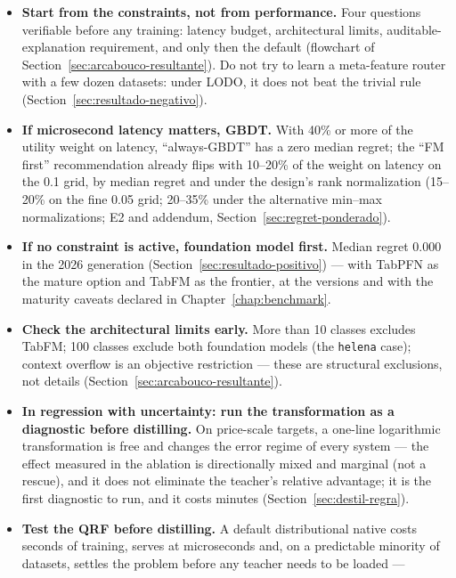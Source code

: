 \begin{itemize}
  \item \textbf{Start from the constraints, not from performance.}
    Four questions verifiable before any training: latency budget,
    architectural limits, auditable-explanation requirement, and only
    then the default (flowchart of
    Section~\ref{sec:arcabouco-resultante}). Do not try to learn a
    meta-feature router with a few dozen datasets: under LODO, it
    does not beat the trivial rule
    (Section~\ref{sec:resultado-negativo}).
  \item \textbf{If microsecond latency matters, GBDT.} With 40\% or
    more of the utility weight on latency, ``always-GBDT'' has a
    zero median regret; the ``FM first'' recommendation already
    flips with 10--20\% of the weight on latency on the 0.1 grid,
    by median regret
    and under the design's rank normalization (15--20\% on the fine
    0.05 grid; 20--35\% under the
    alternative min--max normalizations; E2 and addendum,
    Section~\ref{sec:regret-ponderado}).
  \item \textbf{If no constraint is active, foundation model
    first.} Median regret 0.000 in the 2026 generation
    (Section~\ref{sec:resultado-positivo}) --- with TabPFN as the
    mature option and TabFM as the frontier, at the versions and
    with the maturity caveats declared in
    Chapter~\ref{chap:benchmark}.
  \item \textbf{Check the architectural limits early.} More than 10
    classes excludes TabFM; 100 classes exclude both foundation
    models (the \texttt{helena} case); context overflow is an
    objective restriction --- these are structural exclusions, not
    details (Section~\ref{sec:arcabouco-resultante}).
  \item \textbf{In regression with uncertainty: run the
    transformation as a diagnostic before
    distilling.} On price-scale targets, a one-line logarithmic
    transformation is free and changes the error regime of every
    system --- the effect measured in the ablation is directionally
    mixed and marginal (not a rescue), and it does not eliminate
    the teacher's relative
    advantage; it is the first diagnostic to run, and it costs
    minutes (Section~\ref{sec:destil-regra}).
  \item \textbf{Test the QRF before distilling.} A default
    distributional native costs seconds of training, serves at
    microseconds and, on a predictable minority of datasets,
    settles the problem before any teacher needs to be loaded ---

\end{itemize}
